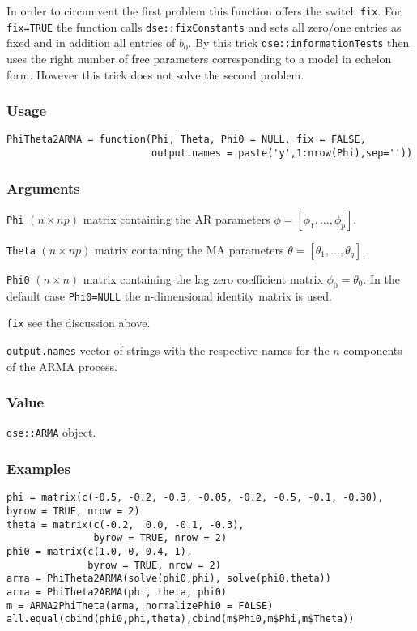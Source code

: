 \documentclass[]{article}
\begin{document}
In order to circumvent the first problem this function offers the switch
\texttt{fix}. For \texttt{fix=TRUE} the function calls
\texttt{dse::fixConstants} and sets all zero/one entries as fixed and in
addition all entries of \(b_0\). By this trick
\texttt{dse::informationTests} then uses the right number of free
parameters corresponding to a model in echelon form. However this trick
does not solve the second problem.

\subsubsection*{Usage}\begin{verbatim}
PhiTheta2ARMA = function(Phi, Theta, Phi0 = NULL, fix = FALSE,
                         output.names = paste('y',1:nrow(Phi),sep=''))
\end{verbatim}\subsubsection*{Arguments}\begin{description}
\item \texttt{Phi} $(n \times np)$ matrix containing the AR parameters
       $\phi = [\phi_1,\ldots,\phi_p]$.
\item \texttt{Theta} $(n \times np)$ matrix containing the MA parameters
       $\theta = [\theta_1,\ldots,\theta_q]$.
\item \texttt{Phi0}  $(n \times n)$ matrix containing the lag zero coefficient matrix
       $\phi_0 = \theta_0$. In the default case \texttt{Phi0=NULL} 
       the n-dimensional identity matrix is used.
\item \texttt{fix}  see the discussion above.
\item \texttt{output.names} vector of strings with the respective names for the
       $n$ components of the ARMA process.
\end{description}\subsubsection*{Value}

\texttt{dse::ARMA} object. \subsubsection*{Examples}

\begin{verbatim}
phi = matrix(c(-0.5, -0.2, -0.3, -0.05, -0.2, -0.5, -0.1, -0.30),
byrow = TRUE, nrow = 2)
theta = matrix(c(-0.2,  0.0, -0.1, -0.3),
               byrow = TRUE, nrow = 2)
phi0 = matrix(c(1.0, 0, 0.4, 1),
              byrow = TRUE, nrow = 2)
arma = PhiTheta2ARMA(solve(phi0,phi), solve(phi0,theta))
arma = PhiTheta2ARMA(phi, theta, phi0)
m = ARMA2PhiTheta(arma, normalizePhi0 = FALSE)
all.equal(cbind(phi0,phi,theta),cbind(m$Phi0,m$Phi,m$Theta))
\end{verbatim}
\end{document}

